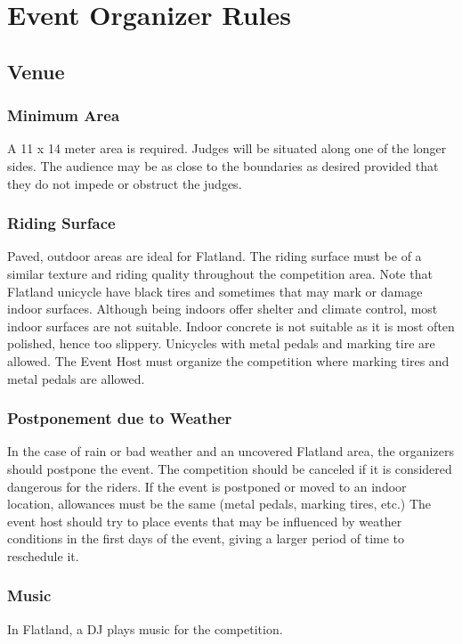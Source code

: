 \chapter{Event Organizer Rules}

\section{Venue}

\subsection{Minimum Area \label{sec:flat-street_flatland-performing-area}}
A 11 x 14 meter area is required.
Judges will be situated along one of the longer sides.
The audience may be as close to the boundaries as desired provided that they do not impede or obstruct the judges.

\subsection{Riding Surface}
Paved, outdoor areas are ideal for Flatland.
The riding surface must be of a similar texture and riding quality throughout the competition area.
Note that Flatland unicycle have black tires and sometimes that may mark or damage indoor surfaces.
Although being indoors offer shelter and climate control, most indoor surfaces are not suitable.
Indoor concrete is not suitable as it is most often polished, hence too slippery.
Unicycles with metal pedals and marking tire are allowed.
The Event Host must organize the competition where marking tires and metal pedals are allowed.

\subsection{Postponement due to Weather}

In the case of rain or bad weather and an uncovered Flatland area, the organizers should postpone the event.
The competition should be canceled if it is considered dangerous for the riders.
If the event is postponed or moved to an indoor location, allowances must be the same (metal pedals, marking tires, etc.)
The event host should try to place events that may be influenced by weather conditions in the first days of the event, giving a larger period of time to reschedule it.

\subsection{Music}
In Flatland, a DJ plays music for the competition.

